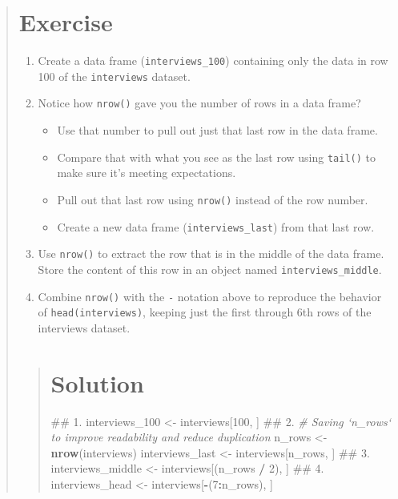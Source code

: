 \documentclass[]{book}
\newenvironment{Shaded}{\begin{snugshade}}{\end{snugshade}}
\newcommand{\KeywordTok}[1]{\textcolor[rgb]{0.13,0.29,0.53}{\textbf{#1}}}
\newcommand{\DecValTok}[1]{\textcolor[rgb]{0.00,0.00,0.81}{#1}}
\newcommand{\StringTok}[1]{\textcolor[rgb]{0.31,0.60,0.02}{#1}}
\newcommand{\CommentTok}[1]{\textcolor[rgb]{0.56,0.35,0.01}{\textit{#1}}}
\newcommand{\OperatorTok}[1]{\textcolor[rgb]{0.81,0.36,0.00}{\textbf{#1}}}
\newcommand{\NormalTok}[1]{#1}
\providecommand{\tightlist}{%
  \setlength{\itemsep}{0pt}\setlength{\parskip}{0pt}}
\begin{document}
\begin{quote}
\section{Exercise}\label{exercise-6}

\begin{enumerate}
\def\labelenumi{\arabic{enumi}.}
\item
  Create a data frame (\texttt{interviews\_100}) containing only the
  data in row 100 of the \texttt{interviews} dataset.
\item
  Notice how \texttt{nrow()} gave you the number of rows in a data
  frame?

  \begin{itemize}
  \tightlist
  \item
    Use that number to pull out just that last row in the data frame.
  \item
    Compare that with what you see as the last row using \texttt{tail()}
    to make sure it's meeting expectations.
  \item
    Pull out that last row using \texttt{nrow()} instead of the row
    number.
  \item
    Create a new data frame (\texttt{interviews\_last}) from that last
    row.
  \end{itemize}
\item
  Use \texttt{nrow()} to extract the row that is in the middle of the
  data frame. Store the content of this row in an object named
  \texttt{interviews\_middle}.
\item
  Combine \texttt{nrow()} with the \texttt{-} notation above to
  reproduce the behavior of \texttt{head(interviews)}, keeping just the
  first through 6th rows of the interviews dataset.
\end{enumerate}

\begin{quote}
\section{Solution}\label{solution-5}

\begin{Shaded}
\begin{Highlighting}[]
\NormalTok{## 1.}
\NormalTok{interviews_}\DecValTok{100}\NormalTok{ <-}\StringTok{ }\NormalTok{interviews[}\DecValTok{100}\NormalTok{, ]}
\NormalTok{## 2.}
\CommentTok{# Saving `n_rows` to improve readability and reduce duplication}
\NormalTok{n_rows <-}\StringTok{ }\KeywordTok{nrow}\NormalTok{(interviews)}
\NormalTok{interviews_last <-}\StringTok{ }\NormalTok{interviews[n_rows, ]}
\NormalTok{## 3.}
\NormalTok{interviews_middle <-}\StringTok{ }\NormalTok{interviews[(n_rows }\OperatorTok{/}\StringTok{ }\DecValTok{2}\NormalTok{), ]}
\NormalTok{## 4.}
\NormalTok{interviews_head <-}\StringTok{ }\NormalTok{interviews[}\OperatorTok{-}\NormalTok{(}\DecValTok{7}\OperatorTok{:}\NormalTok{n_rows), ]}
\end{Highlighting}
\end{Shaded}
\end{quote}
\end{quote}
\end{document}
